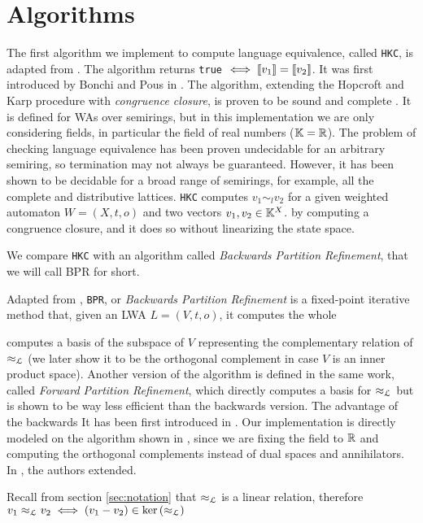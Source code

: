 \section{Algorithms}
The first algorithm we implement to compute language equivalence, called \texttt{HKC},
is adapted from \cite{DBLP:journals/corr/Bonchi0K17}. 
The algorithm returns \texttt{true} $\iff \llbracket v_1\rrbracket = \llbracket v_2\rrbracket$.
It was first introduced by 
Bonchi and Pous in \cite{bonchi2013checking}.
The algorithm, extending the Hopcroft and Karp procedure 
\cite{hopcroft1971linear} with \textit{congruence closure}, is 
proven to be sound and complete \cite{DBLP:journals/corr/Bonchi0K17}.
It is defined for 
WAs over semirings, but in this implementation we are only 
considering fields, in particular 
the field of real numbers ($\mathbb{K} = \mathbb{R}$).
The problem of checking language equivalence 
has been proven undecidable for an arbitrary semiring, so termination 
may not always be guaranteed. However, it has been shown to be decidable
for a broad range of semirings, for example, all the complete and
distributive lattices.
\texttt{HKC} computes $v_1 \sim_l v_2$ for a given weighted automaton
$W = (X, t, o)$ and two vectors $v_1, v_2 \in \mathbb{K}^X$. 
by computing a congruence closure,
and it does so without linearizing the state space. 

We compare \texttt{HKC} with an algorithm called 
\textit{Backwards Partition Refinement}, that we will call BPR for short. 

Adapted from \cite{BONCHI201277}, 
\texttt{BPR}, or \textit{Backwards Partition Refinement}
is a fixed-point iterative method that, given an LWA
$L = (V, t, o)$, it computes the whole 

computes a basis of the subspace of $V$
representing the complementary relation of $\approx_{\mathcal{L}}$ (we later show it to be the 
orthogonal complement in case $V$ is an inner product space). 
Another version of the algorithm is defined in the same work,
called \textit{Forward Partition Refinement}, which directly computes
a basis for $\approx_{\mathcal{L}}$ but is shown to be way less efficient than the backwards version.
The advantage of the backwards
It has been first introduced in \cite{boreale2009weighted}.
Our implementation is directly modeled on the algorithm shown in 
\cite{boreale2009weighted}, since we are fixing the field 
to $\mathbb{R}$ and computing the orthogonal complements instead of 
dual spaces and annihilators. In \cite{BONCHI201277}, the authors 
extended.


\begin{note}
    Recall from section \ref{sec:notation} that $\approx_{\mathcal{L}}$ is a linear relation, 
    therefore $v_1 \approx_{\mathcal{L}} v_2 \iff (v_1 - v_2) \in \text{ker}\left(\approx_{\mathcal{L}}\right)$
\end{note}


